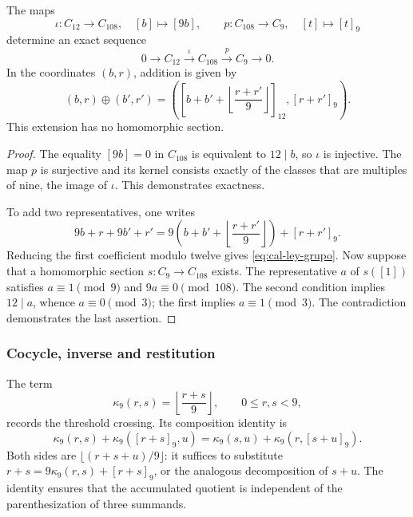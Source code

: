\begin{teorema}
\label{thm:cal-extension}
The maps
\[
 \iota:C_{12}\longrightarrow C_{108},\quad[b]\longmapsto[9b],
 \qquad p:C_{108}\longrightarrow C_9,\quad[t]\longmapsto[t]_9
\]
determine an exact sequence
\begin{equation}
 0\longrightarrow C_{12}\xrightarrow{\ \iota\ }C_{108}
 \xrightarrow{\ p\ }C_9\longrightarrow0.
 \label{eq:cal-extension}
\end{equation}
In the coordinates $(b,r)$, addition is given by
\begin{equation}
 (b,r)\oplus(b',r')=
 \left(\left[b+b'+\left\lfloor\frac{r+r'}9\right\rfloor\right]_{12},
 [r+r']_9\right).
 \label{eq:cal-ley-grupo}
\end{equation}
This extension has no homomorphic section.
\end{teorema}
\begin{proof}
The equality $[9b]=0$ in $C_{108}$ is equivalent to $12\mid b$, so
$\iota$ is injective. The map $p$ is surjective and its kernel
consists exactly of the classes that are multiples of nine, the image of
$\iota$. This demonstrates exactness.

To add two representatives, one writes
\[
 9b+r+9b'+r'
 =9\left(b+b'+\left\lfloor\frac{r+r'}9\right\rfloor\right)
   +[r+r']_9.
\]
Reducing the first coefficient modulo twelve gives
\eqref{eq:cal-ley-grupo}. Now suppose that a homomorphic
section $s:C_9\to C_{108}$ exists. The representative $a$ of $s([1])$
satisfies $a\equiv1\pmod9$ and $9a\equiv0\pmod{108}$. The second
condition implies $12\mid a$, whence $a\equiv0\pmod3$; the first
implies $a\equiv1\pmod3$. The contradiction demonstrates the last
assertion.
\end{proof}

\subsubsection{Cocycle, inverse and restitution}

The term
\[
 \kappa_9(r,s)=\left\lfloor\frac{r+s}9\right\rfloor,
 \qquad 0\leq r,s<9,
\]
records the threshold crossing. Its composition identity is
\begin{equation}
 \kappa_9(r,s)+\kappa_9([r+s]_9,u)
 =\kappa_9(s,u)+\kappa_9(r,[s+u]_9).
 \label{eq:cal-cociclo}
\end{equation}
Both sides are $\lfloor(r+s+u)/9\rfloor$: it suffices to substitute
$r+s=9\kappa_9(r,s)+[r+s]_9$, or the analogous decomposition of $s+u$.
The identity ensures that the accumulated quotient is independent of the
parenthesization of three summands.

